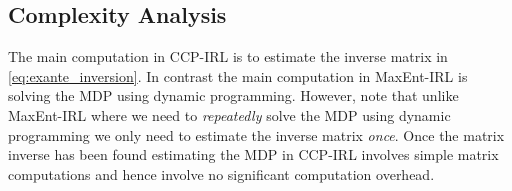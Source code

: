 \documentclass{article}
\begin{document}
%


\subsection{Complexity Analysis}
The main computation in CCP-IRL is to estimate the inverse matrix in \eqref{eq:exante_inversion}.
In contrast the main computation in MaxEnt-IRL is solving the MDP using dynamic programming.
However, note that unlike MaxEnt-IRL where we need to \textit{repeatedly} solve the MDP using dynamic programming we only need to estimate the inverse matrix \textit{once}.
Once the matrix inverse has been found estimating the MDP in CCP-IRL involves simple matrix computations and hence involve no significant computation overhead.
\end{document}
